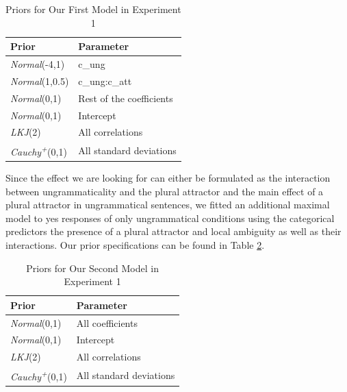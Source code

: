 \begin{table}[hbt!]
    \caption{Priors for Our First Model in Experiment 1}
    \vspace{10pt}
    \begin{tabular}{ll}
      \hline
        Prior         & Parameter                \\\hline
        \emph{Normal}(-4,1)  & c\_ung                   \\
        \emph{Normal}(1,0.5) & c\_ung:c\_att            \\
        \emph{Normal}(0,1)   & Rest of the coefficients \\
        \emph{Normal}(0,1)  & Intercept\\
        \emph{LKJ}(2)        & All correlations         \\
        \emph{Cauchy}\textsuperscript{\it +}(0,1)   & All standard deviations \\ \hline
    \end{tabular}
  
    \label{tab:exp1M1_priors}
\end{table}

Since the effect we are looking for can either be formulated as the interaction between ungrammaticality and the plural attractor and the main effect of a plural attractor in ungrammatical sentences, we fitted an additional maximal model to yes responses of only ungrammatical conditions using the categorical predictors the presence of a plural attractor and local ambiguity as well as their interactions. Our prior specifications can be found in Table \ref{tab:exp1M2_priors}.


\begin{table}[hbt!]
    \caption{Priors for Our Second Model in Experiment 1}
    \vspace{10pt}
    \begin{tabular}{ll}
      \hline
        Prior         & Parameter                \\\hline
        \emph{Normal}(0,1)   & All coefficients \\
        \emph{Normal}(0,1)  & Intercept\\
        \emph{LKJ}(2)        & All correlations         \\
        \emph{Cauchy}\textsuperscript{\it +}(0,1)   & All standard deviations \\ \hline
    \end{tabular}
  
    \label{tab:exp1M2_priors}
\end{table}


